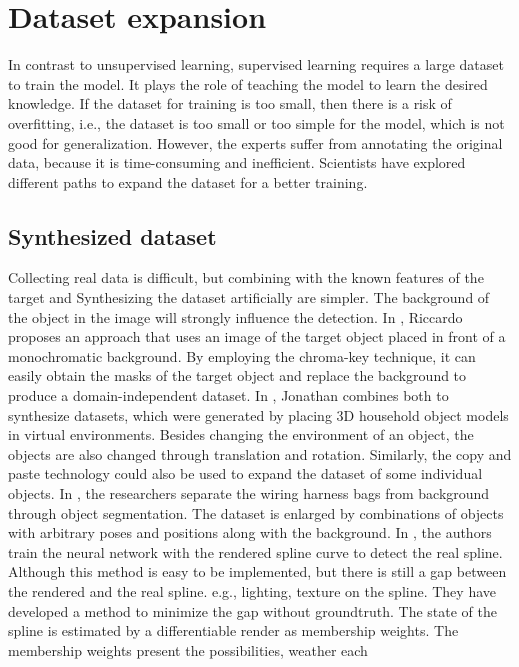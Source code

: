 \section{Dataset expansion}
    In contrast to unsupervised learning, supervised learning requires a large dataset to train the model. It plays the role of teaching the model to learn the desired knowledge.
    If the dataset for training is too small, then there is a risk of overfitting, i.e., the dataset is too small or too simple for the model, which is not good for generalization.
    However, the experts suffer from annotating the original data, because it is time-consuming and inefficient. Scientists have explored different paths to expand the dataset 
    for a better training. 
\subsection{Synthesized dataset}
    Collecting real data is difficult, but combining with the known features of the target and Synthesizing the dataset artificially are simpler. The background of the object in the 
    image will strongly influence the detection. 
    In \cite{9349395}, Riccardo proposes an approach that uses an image of the target object placed in front of a monochromatic background. By employing the chroma-key technique,
    it can easily obtain the masks of the target object and replace the background to produce a domain-independent dataset. In \cite{Tremblay_2018_CVPR_Workshops}, Jonathan combines 
    both to synthesize datasets, which were generated by placing 3D household object models in virtual environments. Besides changing the environment of an object, the objects are 
    also changed through translation and rotation. Similarly, the copy and paste technology could also be used to expand the dataset of some individual objects. In \cite{10196168},
    the researchers separate the wiring harness bags from background through object segmentation. The dataset is enlarged by combinations of objects with arbitrary 
    poses and positions along with the background.
    In \cite{8972568}, the authors train the neural network with the rendered spline curve to detect the real spline. Although this 
    method is easy to be implemented, but there is still a gap between the rendered and the real spline. e.g., lighting, texture on the spline. They have developed a method to minimize
    the gap without groundtruth. The state of the spline is estimated by a differentiable render as membership weights. The membership weights present the possibilities, weather each 
